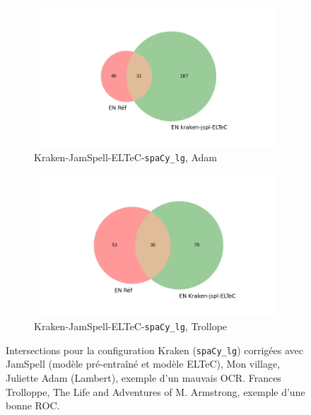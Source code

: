 \begin{figure}
  \begin{minipage}{7cm}
  \begin{subfigure}{1\textwidth}
  \includegraphics[width=1\textwidth]{IMAGES/ELTeC_INTERSECTIONS_spaCy3.5.1/ADAM_Mon-village_Kraken-base_jamspell-ELTeCmodel-fr.txt_spacy-lg-concat.json_intersection.png} 
  \caption{Kraken-JamSpell-ELTeC-\texttt{spaCy\_lg}, Adam}
  \end{subfigure}
    \end{minipage}
       \begin{minipage}{7cm}
  \begin{subfigure}{1\textwidth}
  \includegraphics[width=1\textwidth]{IMAGES/ELTeC_INTERSECTIONS_spaCy3.5.1/TROLLOPE_Adventure_Kraken_jamspell-ELTeCmodel-en.txt_spacy-lg-concat.json_intersection.png} 
  \caption{Kraken-JamSpell-ELTeC-\texttt{spaCy\_lg}, Trollope}
  \label{fig:}
  \end{subfigure}
    \end{minipage}
\caption{Intersections pour la configuration Kraken (\texttt{spaCy\_lg}) corrigées avec JamSpell (modèle pré-entraîné et modèle ELTeC), {\normalfont Mon village}, Juliette Adam (Lambert), exemple d'un mauvais OCR. Frances Trolloppe, {\normalfont The Life and Adventures of M. Armstrong}, exemple d'une bonne ROC.}
\label{fig:ADAM_TROLLOPPE_INTERSECTIONS}
\end{figure}

